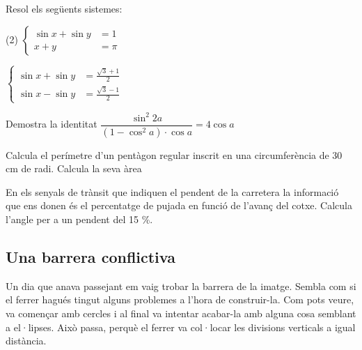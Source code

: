 \begin{autoaval}{50}
\begin{mylist}
\exer[2]
  Resol els següents sistemes: 
  \begin{tasks}(2)
  \task $\left\{ \begin{array}{ll} \sin x + \sin y &=1 \\ x+y&=\pi \end{array} \right.$
  
  \task $\left\{ \begin{array}{ll} \sin x + \sin y&= \frac{\sqrt{3}+1}{2} \\\sin x - \sin y &= \frac{\sqrt{3}-1}{2} \end{array} \right.$
\end{tasks}
 

\exer[2]
  Demostra la identitat
 $\dfrac{\sin^2 2a}{(1-\cos^2 a) \cdot \cos a}=4 \cos a$


\exer[2]
  Calcula el perímetre d'un pentàgon regular inscrit en una
  circumferència de 30 cm de radi. Calcula la seva àrea

\exer[2]
  En els senyals de trànsit que indiquen el pendent de la carretera la
  informació que ens donen és el percentatge de pujada en funció de
  l'avanç del cotxe. Calcula l'angle per a un pendent del 15 \%.

\end{mylist}
\end{autoaval}

\newpage
{}

\subsection*{Una barrera conflictiva}

Un dia que anava passejant em vaig trobar la barrera de la imatge. Sembla com si el ferrer hagués tingut alguns problemes a l'hora de construir-la. Com pots veure, va començar amb cercles i al final va intentar acabar-la amb alguna cosa semblant a el·lipses. Això passa, perquè el ferrer va col·locar les divisions verticals a igual distància.

